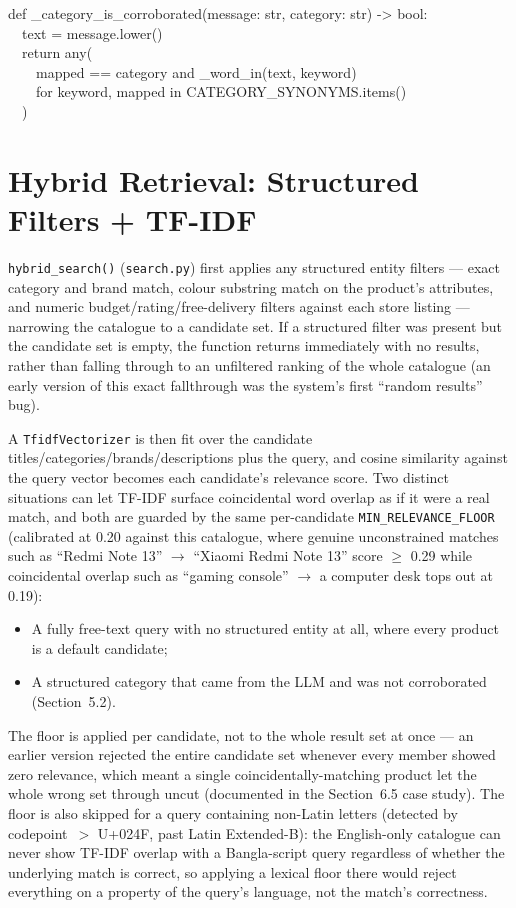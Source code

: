\documentclass[12pt,a4paper]{report}
\newcommand{\codebox}[1]{%
  \par\noindent\colorbox{codebg}{%
    \begin{minipage}{\dimexpr\linewidth-2\fboxsep}
      \ttfamily\small\color{codeink}
      #1
    \end{minipage}%
  }\par\vspace{6pt}
}
\begin{document}
\codebox{%
def \_category\_is\_corroborated(message: str, category: str) -\/> bool:\\
\ \ text = message.lower()\\
\ \ return any(\\
\ \ \ \ mapped == category and \_word\_in(text, keyword)\\
\ \ \ \ for keyword, mapped in CATEGORY\_SYNONYMS.items()\\
\ \ )
}

\section{Hybrid Retrieval: Structured Filters + TF-IDF}
\texttt{hybrid\_search()} (\texttt{search.py}) first applies any structured entity filters --- exact
category and brand match, colour substring match on the product's attributes, and numeric
budget/rating/free-delivery filters against each store listing --- narrowing the catalogue to a candidate
set. If a structured filter was present but the candidate set is empty, the function returns immediately
with no results, rather than falling through to an unfiltered ranking of the whole catalogue (an early
version of this exact fallthrough was the system's first ``random results'' bug).

A \texttt{TfidfVectorizer} is then fit over the candidate titles/categories/brands/descriptions plus the
query, and cosine similarity against the query vector becomes each candidate's relevance score. Two
distinct situations can let TF-IDF surface coincidental word overlap as if it were a real match, and both
are guarded by the same per-candidate \texttt{MIN\_RELEVANCE\_FLOOR} (calibrated at 0.20 against this
catalogue, where genuine unconstrained matches such as ``Redmi Note 13'' $\rightarrow$ ``Xiaomi Redmi Note
13'' score $\geq$ 0.29 while coincidental overlap such as ``gaming console'' $\rightarrow$ a computer desk
tops out at 0.19):
\begin{itemize}
\item A fully free-text query with no structured entity at all, where every product is a default
candidate;
\item A structured category that came from the LLM and was not corroborated (Section~5.2).
\end{itemize}

\noindent The floor is applied per candidate, not to the whole result set at once --- an earlier version
rejected the entire candidate set whenever every member showed zero relevance, which meant a single
coincidentally-matching product let the whole wrong set through uncut (documented in the Section~6.5 case
study). The floor is also skipped for a query containing non-Latin letters (detected by codepoint~$>$
U+024F, past Latin Extended-B): the English-only catalogue can never show TF-IDF overlap with a
Bangla-script query regardless of whether the underlying match is correct, so applying a lexical floor
there would reject everything on a property of the query's language, not the match's correctness.
\end{document}
